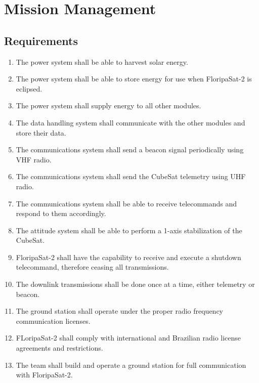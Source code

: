 %
%
%
%
%

%
%
%
%
%
%

\chapter{Mission Management} \label{ch:management}

\section{Requirements}

\begin{enumerate}
    \item The power system shall be able to harvest solar energy.
    \item The power system shall be able to store energy for use when FloripaSat-2 is eclipsed.
    \item The power system shall supply energy to all other modules.
    \item The data handling system shall communicate with the other modules and store their data.
    \item The communications system shall send a beacon signal periodically using VHF radio.
    \item The communications system shall send the CubeSat telemetry using UHF radio.
    \item The communications system shall be able to receive telecommands and respond to them accordingly.
    \item The attitude system shall be able to perform a 1-axis stabilization of the CubeSat.
    \item FloripaSat-2 shall have the capability to receive and execute a shutdown telecommand, therefore ceasing all transmissions.
    \item The downlink transmissions shall be done once at a time, either telemetry or beacon.
    \item The ground station shall operate under the proper radio frequency communication licenses.
    \item FLoripaSat-2 shall comply with international and Brazilian radio license agreements and restrictions.
    \item The team shall build and operate a ground station for full communication with FloripaSat-2.
\end{enumerate}

